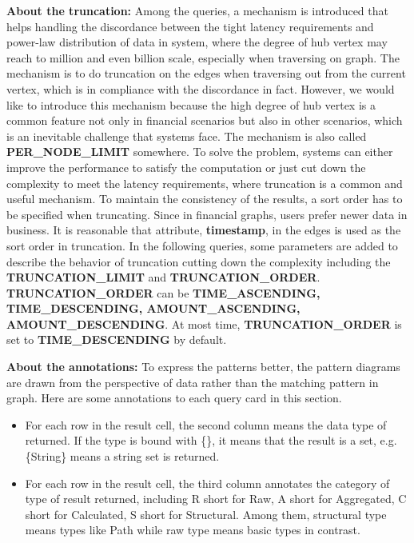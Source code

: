 {\flushleft \textbf{About the truncation:}} Among the queries, a mechanism is
introduced that helps handling the discordance between the tight latency requirements
and power-law distribution of data in system, where the degree of hub vertex may
reach to million and even billion scale, especially when traversing on graph.
The mechanism is to do truncation on the edges when traversing out from the
current vertex, which is in compliance with the discordance in fact. However, we
would like to introduce this mechanism because the high degree of hub vertex is
a common feature not only in financial scenarios but also in other scenarios,
which is an inevitable challenge that systems face. The mechanism is also called
\textbf{PER\_NODE\_LIMIT} somewhere. To solve the problem, systems can either
improve the performance to satisfy the computation or just cut down the
complexity to meet the latency requirements, where truncation is a common and
useful mechanism. To maintain the consistency of the results, a sort order has
to be specified when truncating. Since in financial graphs, users prefer newer
data in business. It is reasonable that attribute, \textbf{timestamp}, in the
edges is used as the sort order in truncation. In the following queries, some
parameters are added to describe the behavior of truncation cutting down the
complexity including the \textbf{TRUNCATION\_LIMIT} and \textbf{TRUNCATION\_ORDER}.
\textbf{TRUNCATION\_ORDER} can be \textbf{TIME\_ASCENDING, TIME\_DESCENDING,
AMOUNT\_ASCENDING, AMOUNT\_DESCENDING}. At most time, \textbf{TRUNCATION\_ORDER}
is set to \textbf{TIME\_DESCENDING} by default.

{\flushleft \textbf{About the annotations:}} To express the patterns better, the
pattern diagrams are drawn from the perspective of data rather than the matching
pattern in graph. Here are some annotations to each query card in this section.
\begin{itemize}
      \item For each row in the result cell, the second column means the data
      type of returned. If the type is bound with \{\}, it means that the
      result is a set, e.g. \{String\} means a string set is returned.
      \item For each row in the result cell, the third column annotates the
      category of type of result returned, including R short for Raw, A short
      for Aggregated, C short for Calculated, S short for Structural. Among
      them, structural type means types like Path while raw type means basic
      types in contrast.
\end{itemize}


